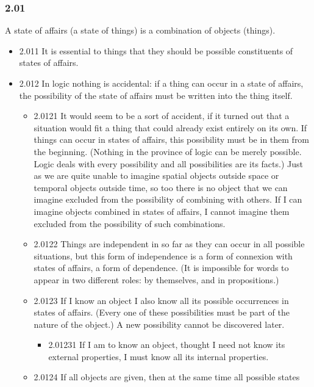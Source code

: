 \documentclass[11pt]{article}
\begin{document}
\subsubsection*{2.01}
\label{sec:org78c3de0}
A state of affairs (a state of things) is a combination of objects
(things).
\begin{itemize}
\item 2.011
\label{sec:org437acf1}
It is essential to things that they should be possible constituents
of states of affairs.
\item 2.012
\label{sec:org1ca9e49}
In logic nothing is accidental: if a thing can occur in a state of
affairs, the possibility of the state of affairs must be written into the
thing itself.
\begin{itemize}
\item 2.0121
\label{sec:org7bd7149}
It would seem to be a sort of accident, if it turned out that a
situation would fit a thing that could already exist entirely on its own.
If things can occur in states of affairs, this possibility must be in them
from the beginning. (Nothing in the province of logic can be merely
possible. Logic deals with every possibility and all possibilities are its
facts.) Just as we are quite unable to imagine spatial objects outside
space or temporal objects outside time, so too there is no object that we
can imagine excluded from the possibility of combining with others. If I
can imagine objects combined in states of affairs, I cannot imagine them
excluded from the possibility of such combinations.
\item 2.0122
\label{sec:org2867b5c}
Things are independent in so far as they can occur in all possible
situations, but this form of independence is a form of connexion with
states of affairs, a form of dependence. (It is impossible for words to
appear in two different roles: by themselves, and in propositions.)
\item 2.0123
\label{sec:org9655f9c}
If I know an object I also know all its possible occurrences in
states of affairs. (Every one of these possibilities must be part of the
nature of the object.) A new possibility cannot be discovered later.
\begin{itemize}
\item 2.01231
\label{sec:org68d6604}
If I am to know an object, thought I need not know its external
properties, I must know all its internal properties.
\end{itemize}
\item 2.0124
\label{sec:orgdc07af9}
If all objects are given, then at the same time all possible states

\end{itemize}
\end{itemize}
\end{document}
